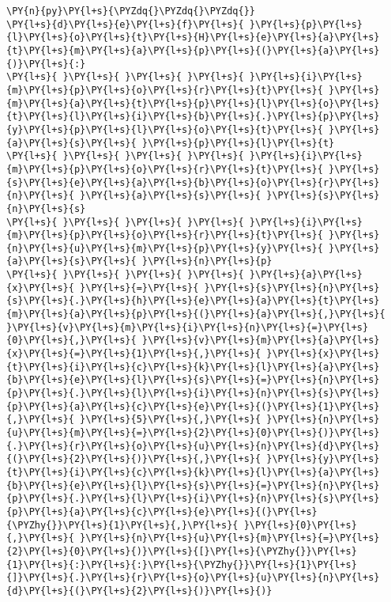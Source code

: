 \documentclass[main.tex]{subfiles}
\begin{document}
    \begin{tcolorbox}[breakable, size=fbox, boxrule=1pt, pad at break*=1mm,colback=cellbackground, colframe=cellborder]
\begin{Verbatim}[commandchars=\\\{\}]
\PY{n}{py}\PY{l+s}{\PYZdq{}\PYZdq{}\PYZdq{}}
\PY{l+s}{d}\PY{l+s}{e}\PY{l+s}{f}\PY{l+s}{ }\PY{l+s}{p}\PY{l+s}{l}\PY{l+s}{o}\PY{l+s}{t}\PY{l+s}{H}\PY{l+s}{e}\PY{l+s}{a}\PY{l+s}{t}\PY{l+s}{m}\PY{l+s}{a}\PY{l+s}{p}\PY{l+s}{(}\PY{l+s}{a}\PY{l+s}{)}\PY{l+s}{:}
\PY{l+s}{ }\PY{l+s}{ }\PY{l+s}{ }\PY{l+s}{ }\PY{l+s}{i}\PY{l+s}{m}\PY{l+s}{p}\PY{l+s}{o}\PY{l+s}{r}\PY{l+s}{t}\PY{l+s}{ }\PY{l+s}{m}\PY{l+s}{a}\PY{l+s}{t}\PY{l+s}{p}\PY{l+s}{l}\PY{l+s}{o}\PY{l+s}{t}\PY{l+s}{l}\PY{l+s}{i}\PY{l+s}{b}\PY{l+s}{.}\PY{l+s}{p}\PY{l+s}{y}\PY{l+s}{p}\PY{l+s}{l}\PY{l+s}{o}\PY{l+s}{t}\PY{l+s}{ }\PY{l+s}{a}\PY{l+s}{s}\PY{l+s}{ }\PY{l+s}{p}\PY{l+s}{l}\PY{l+s}{t}
\PY{l+s}{ }\PY{l+s}{ }\PY{l+s}{ }\PY{l+s}{ }\PY{l+s}{i}\PY{l+s}{m}\PY{l+s}{p}\PY{l+s}{o}\PY{l+s}{r}\PY{l+s}{t}\PY{l+s}{ }\PY{l+s}{s}\PY{l+s}{e}\PY{l+s}{a}\PY{l+s}{b}\PY{l+s}{o}\PY{l+s}{r}\PY{l+s}{n}\PY{l+s}{ }\PY{l+s}{a}\PY{l+s}{s}\PY{l+s}{ }\PY{l+s}{s}\PY{l+s}{n}\PY{l+s}{s}
\PY{l+s}{ }\PY{l+s}{ }\PY{l+s}{ }\PY{l+s}{ }\PY{l+s}{i}\PY{l+s}{m}\PY{l+s}{p}\PY{l+s}{o}\PY{l+s}{r}\PY{l+s}{t}\PY{l+s}{ }\PY{l+s}{n}\PY{l+s}{u}\PY{l+s}{m}\PY{l+s}{p}\PY{l+s}{y}\PY{l+s}{ }\PY{l+s}{a}\PY{l+s}{s}\PY{l+s}{ }\PY{l+s}{n}\PY{l+s}{p}
\PY{l+s}{ }\PY{l+s}{ }\PY{l+s}{ }\PY{l+s}{ }\PY{l+s}{a}\PY{l+s}{x}\PY{l+s}{ }\PY{l+s}{=}\PY{l+s}{ }\PY{l+s}{s}\PY{l+s}{n}\PY{l+s}{s}\PY{l+s}{.}\PY{l+s}{h}\PY{l+s}{e}\PY{l+s}{a}\PY{l+s}{t}\PY{l+s}{m}\PY{l+s}{a}\PY{l+s}{p}\PY{l+s}{(}\PY{l+s}{a}\PY{l+s}{,}\PY{l+s}{ }\PY{l+s}{v}\PY{l+s}{m}\PY{l+s}{i}\PY{l+s}{n}\PY{l+s}{=}\PY{l+s}{0}\PY{l+s}{,}\PY{l+s}{ }\PY{l+s}{v}\PY{l+s}{m}\PY{l+s}{a}\PY{l+s}{x}\PY{l+s}{=}\PY{l+s}{1}\PY{l+s}{,}\PY{l+s}{ }\PY{l+s}{x}\PY{l+s}{t}\PY{l+s}{i}\PY{l+s}{c}\PY{l+s}{k}\PY{l+s}{l}\PY{l+s}{a}\PY{l+s}{b}\PY{l+s}{e}\PY{l+s}{l}\PY{l+s}{s}\PY{l+s}{=}\PY{l+s}{n}\PY{l+s}{p}\PY{l+s}{.}\PY{l+s}{l}\PY{l+s}{i}\PY{l+s}{n}\PY{l+s}{s}\PY{l+s}{p}\PY{l+s}{a}\PY{l+s}{c}\PY{l+s}{e}\PY{l+s}{(}\PY{l+s}{1}\PY{l+s}{,}\PY{l+s}{ }\PY{l+s}{5}\PY{l+s}{,}\PY{l+s}{ }\PY{l+s}{n}\PY{l+s}{u}\PY{l+s}{m}\PY{l+s}{=}\PY{l+s}{2}\PY{l+s}{0}\PY{l+s}{)}\PY{l+s}{.}\PY{l+s}{r}\PY{l+s}{o}\PY{l+s}{u}\PY{l+s}{n}\PY{l+s}{d}\PY{l+s}{(}\PY{l+s}{2}\PY{l+s}{)}\PY{l+s}{,}\PY{l+s}{ }\PY{l+s}{y}\PY{l+s}{t}\PY{l+s}{i}\PY{l+s}{c}\PY{l+s}{k}\PY{l+s}{l}\PY{l+s}{a}\PY{l+s}{b}\PY{l+s}{e}\PY{l+s}{l}\PY{l+s}{s}\PY{l+s}{=}\PY{l+s}{n}\PY{l+s}{p}\PY{l+s}{.}\PY{l+s}{l}\PY{l+s}{i}\PY{l+s}{n}\PY{l+s}{s}\PY{l+s}{p}\PY{l+s}{a}\PY{l+s}{c}\PY{l+s}{e}\PY{l+s}{(}\PY{l+s}{\PYZhy{}}\PY{l+s}{1}\PY{l+s}{,}\PY{l+s}{ }\PY{l+s}{0}\PY{l+s}{,}\PY{l+s}{ }\PY{l+s}{n}\PY{l+s}{u}\PY{l+s}{m}\PY{l+s}{=}\PY{l+s}{2}\PY{l+s}{0}\PY{l+s}{)}\PY{l+s}{[}\PY{l+s}{\PYZhy{}}\PY{l+s}{1}\PY{l+s}{:}\PY{l+s}{:}\PY{l+s}{\PYZhy{}}\PY{l+s}{1}\PY{l+s}{]}\PY{l+s}{.}\PY{l+s}{r}\PY{l+s}{o}\PY{l+s}{u}\PY{l+s}{n}\PY{l+s}{d}\PY{l+s}{(}\PY{l+s}{2}\PY{l+s}{)}\PY{l+s}{)}

\end{Verbatim}
\end{tcolorbox}
\end{document}
